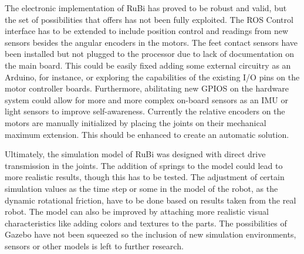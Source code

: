 The electronic implementation of RuBi has proved to be robust and valid, but the set of possibilities that offers has not been fully exploited.
The ROS Control interface has to be extended to include position control and readings from new sensors besides the angular encoders in the motors.
The feet contact sensors have been installed but not plugged to the processor due to lack of documentation on the main board.
This could be easily fixed adding some external circuitry as an Arduino, for instance, or exploring the capabilities of the existing I/O pins on the motor controller boards.
Furthermore, abilitating new GPIOS on the hardware system could allow for more and more complex on-board sensors as an IMU or light sensors to improve self-awareness.
Currently the relative encoders on the motors are manually initialized by placing the joints on their mechanical maximum extension.
This should be enhanced to create an automatic solution.

Ultimately, the simulation model of RuBi was designed with direct drive transmission in the joints.
The addition of springs to the model could lead to more realistic results, though this has to be tested.
The adjustment of certain simulation values as the time step or some in the model of the robot, as the dynamic rotational friction, have to be done based on results taken from the real robot.
The model can also be improved by attaching more realistic visual characteristics like adding colors and textures to the parts.
The possibilities of Gazebo have not been squeezed so the inclusion of new simulation environments, sensors or other models is left to further research.



